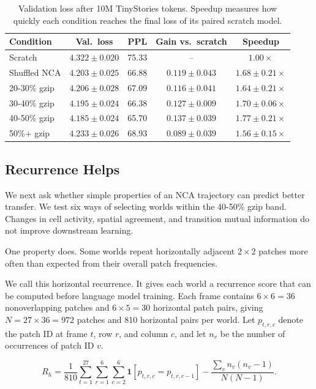 \documentclass[10pt]{article}
\begin{document}
\begin{table}[!htbp]
\centering\small
\caption{Validation loss after 10M TinyStories tokens. Speedup measures how quickly each condition reaches the final loss of its paired scratch model.}
\label{tab:main}
\begin{tabular}{lcccc}
\toprule
Condition & Val.\ loss & PPL & Gain vs.\ scratch & Speedup \\
\midrule
Scratch & $4.322\pm0.020$ & 75.33 & -- & $1.00\times$ \\
Shuffled NCA & $4.203\pm0.025$ & 66.88 & $0.119\pm0.043$ & $1.68\pm0.21\times$ \\
20-30\% gzip & $4.206\pm0.028$ & 67.09 & $0.116\pm0.041$ & $1.64\pm0.21\times$ \\
30-40\% gzip & $4.195\pm0.024$ & 66.38 & $0.127\pm0.009$ & $1.70\pm0.06\times$ \\
40-50\% gzip & $4.185\pm0.024$ & 65.70 & $0.137\pm0.039$ & $1.77\pm0.21\times$ \\
50\%+ gzip & $4.233\pm0.026$ & 68.93 & $0.089\pm0.039$ & $1.56\pm0.15\times$ \\
\bottomrule
\end{tabular}
\end{table}


\subsection{Recurrence Helps}

We next ask whether simple properties of an NCA trajectory can predict better transfer. We test six ways of selecting worlds within the 40-50\% gzip band. Changes in cell activity, spatial agreement, and transition mutual information do not improve downstream learning.

One property does. Some worlds repeat horizontally adjacent $2\times2$ patches more often than expected from their overall patch frequencies.

We call this horizontal recurrence. It gives each world a recurrence score that can be computed before language model training. Each frame contains $6\times6=36$ nonoverlapping patches and $6\times5=30$ horizontal patch pairs, giving $N=27\times36=972$ patches and 810 horizontal pairs per world. Let $p_{t,r,c}$ denote the patch ID at frame $t$, row $r$, and column $c$, and let $n_v$ be the number of occurrences of patch ID $v$.

\[
R_h =
\frac{1}{810}
\sum_{t=1}^{27}
\sum_{r=1}^{6}
\sum_{c=2}^{6}
\mathbf{1}[p_{t,r,c}=p_{t,r,c-1}]
-
\frac{\sum_v n_v(n_v-1)}{N(N-1)}.
\]
\end{document}
